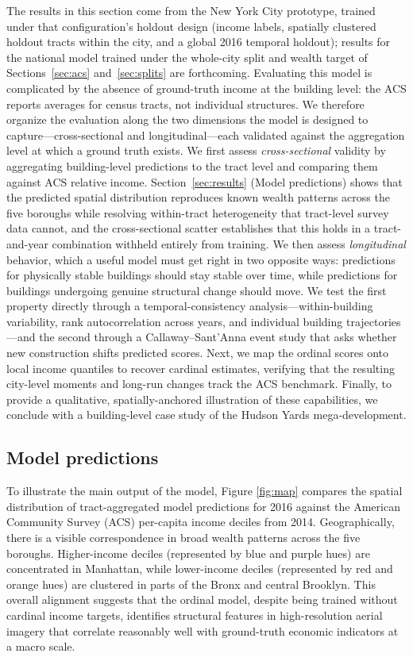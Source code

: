 \documentclass[conference]{IEEEtran}
\begin{document}
The results in this section come from the New York City prototype, trained under that configuration's holdout design (income labels, spatially clustered holdout tracts within the city, and a global 2016 temporal holdout); results for the national model trained under the whole-city split and wealth target of Sections~\ref{sec:acs} and~\ref{sec:splits} are forthcoming. Evaluating this model is complicated by the absence of ground-truth income at the building level: the ACS reports averages for census tracts, not individual structures. We therefore organize the evaluation along the two dimensions the model is designed to capture—cross-sectional and longitudinal—each validated against the aggregation level at which a ground truth exists. We first assess \emph{cross-sectional} validity by aggregating building-level predictions to the tract level and comparing them against ACS relative income. Section~\ref{sec:results} (Model predictions) shows that the predicted spatial distribution reproduces known wealth patterns across the five boroughs while resolving within-tract heterogeneity that tract-level survey data cannot, and the cross-sectional scatter establishes that this holds in a tract-and-year combination withheld entirely from training. We then assess \emph{longitudinal} behavior, which a useful model must get right in two opposite ways: predictions for physically stable buildings should stay stable over time, while predictions for buildings undergoing genuine structural change should move. We test the first property directly through a temporal-consistency analysis—within-building variability, rank autocorrelation across years, and individual building trajectories—and the second through a Callaway--Sant'Anna event study that asks whether new construction shifts predicted scores. Next, we map the ordinal scores onto local income quantiles to recover cardinal estimates, verifying that the resulting city-level moments and long-run changes track the ACS benchmark. Finally, to provide a qualitative, spatially-anchored illustration of these capabilities, we conclude with a building-level case study of the Hudson Yards mega-development.


\subsection{Model predictions}
To illustrate the main output of the model, Figure \ref{fig:map} compares the spatial distribution of tract-aggregated model predictions for 2016 against the American Community Survey (ACS) per-capita income deciles from 2014. Geographically, there is a visible correspondence in broad wealth patterns across the five boroughs. Higher-income deciles (represented by blue and purple hues) are concentrated in Manhattan, while lower-income deciles (represented by red and orange hues) are clustered in parts of the Bronx and central Brooklyn. This overall alignment suggests that the ordinal model, despite being trained without cardinal income targets, identifies structural features in high-resolution aerial imagery that correlate reasonably well with ground-truth economic indicators at a macro scale.
\end{document}
